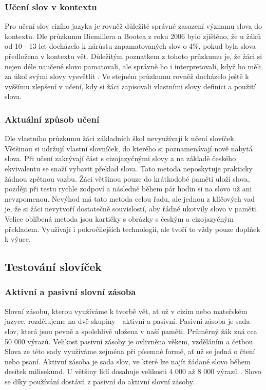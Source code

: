 \documentclass[a4paper,11pt,titlepage,fleqn]{article}
\begin{document}
        \subsubsection{Učení slov v kontextu}
            Pro učení slov cizího jazyka je rovněž důležité správné zasazení významu slova do kontextu. Dle průzkumu Biemillera a Bootea z roku 2006 bylo zjištěno, že u žáků od 10—13 let docházelo k nárůstu zapamatovaných slov o 4\%, pokud byla slova předložena v kontextu vět. Důležitým poznatkem z tohoto průzkumu je, že žáci si nejen déle naučené slovo pamatovali, ale správně ho i interpretovali, když ho měli za úkol svými slovy vysvětlit \cite{bib:beimiller}. Ve stejném průzkumu rovněž docházelo ještě k vyššímu zlepšení v učení, kdy si žáci zapisovali vlastními slovy definici a použití slova.

        \subsubsection{Aktuální způsob učení}
            Dle vlastního průzkumu žáci základních škol nevyužívají k učení slovíček. Většinou si udržují vlastní slovníček, do kterého si poznamenávají nově nabytá slova. Při učení zakrývají část s cizojazyčnými slovy a na základě českého ekvivalentu se snaží vybavit překlad slova. Tato metoda neposkytuje prakticky žádnou zpětnou vazbu. Žáci většinou pouze do krátkodobé paměti uloží slova, později při testu rychle zodpoví a následně během pár hodin si na slovo už ani nevzpomenou. Nevýhod má tato metoda celou řadu, ale jednou z klíčových vad je, že si žáci nevytvoří dostatečně souvislostí, aby řádně ukotvily slovo v paměti. Velice oblíbená metoda jsou kartičky s obrázky s českým a cizojazyčným překladem. Využívají i pokročilejších technologií, ale tvoří to vždy pouze doplňek k výuce.
        
    \subsection{Testování slovíček}

        \subsubsection{Aktivní a pasivní slovní zásoba}
            Slovní zásobu, kterou využíváme k tvorbě vět, ať už v cizím nebo mateřském jazyce, rozdělujeme na dvě skupiny - aktivní a pasivní. Pasivní zásoba je sada slov, která jsou pevně a spolehlivě uložena v naší paměti. Průměrný žák zná cca 50 000 výrazů. Velikost pasivní zásoby je ovlivněna věkem, vzděláním a četbou. Slova ze této sady využíváme zejména při písemné formě, ať už se jedná o čtení nebo psaní. Aktivní zásoba je sada slov, ve které lze najít žádané slovo během desítek milisekund. U většiny lidí dosahuje velikosti 4 000 až 8 000 výrazů \cite{bib:lexikologie}. Slovo se díky používání dostává z pasivní do aktivní slovní zásoby. 
\end{document}
